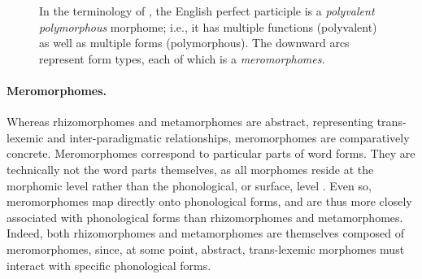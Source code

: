 \begin{figure}[!b]
\begin{mdframed}
\centering
\label{fig:ppgraph}
\caption{In the terminology of \citet{aronoff:1994}, the English perfect participle  is a \emph{polyvalent polymorphous} morphome; i.e., it has multiple functions (polyvalent) as well as multiple forms (polymorphous). The downward arcs represent form types, each of which is a \emph{meromorphomes.}}
\end{mdframed}
\end{figure}

\paragraph{Meromorphomes.} Whereas rhizomorphomes and metamorphomes 
are abstract, representing trans-lexemic and inter-paradigmatic relationships, %
meromorphomes are comparatively concrete. Meromorphomes 
correspond to particular parts of word forms. They 
are technically not the word parts themselves, as all morphomes reside at the 
morphomic level rather than the phonological, or surface, level \citep{round:2011}. 
Even so, meromorphomes map directly onto phonological forms, and 
are thus more closely associated with phonological forms than rhizomorphomes 
and metamorphomes. Indeed, both rhizomorphomes and metamorphomes are themselves
composed of meromorphomes, since, at some point, abstract, trans-lexemic 
morphomes must interact with specific phonological forms. 

